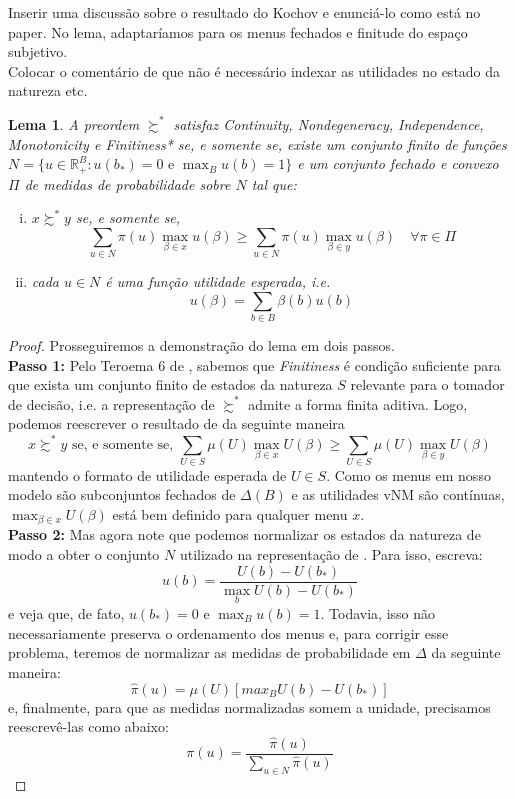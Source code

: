 \documentclass[11pt, a4paper]{article}
\theoremstyle{nonumberplain}
\newtheorem{proof}{Dem.}
\theoremstyle{plain}
\theoremstyle{plain}
\newtheorem{lemma}{Lema}
\begin{document}
{\color{cadmiumgreen}Inserir uma discussão sobre o resultado do Kochov e enunciá-lo como está no paper. No lema, adaptaríamos para os menus fechados e finitude do espaço subjetivo.\\
Colocar o comentário de que não é necessário indexar as utilidades no estado da natureza etc.}


\begin{lemma} A preordem $\succsim^*$ satisfaz \emph{Continuity}, \emph{Nondegeneracy}, \emph{Independence}, \emph{Monotonicity} e \emph{Finitiness*} se, e somente se, existe um conjunto finito de funções $N=\{u \in \mathbb{R}^B_+:u(b_*)=0\text { e }\max_{B}u(b)=1\}$ e um conjunto fechado e convexo $\Pi$ de medidas de probabilidade sobre $N$ tal que:
\begin{enumerate}[(i)]
\item $x\succsim^* y$ se, e somente se, $$ \sum_{u\in N} \pi(u)\max_{\beta\in x}u(\beta) \geq \sum_{u\in N} \pi(u)\max_{\beta\in y}u(\beta)\quad \forall\pi\in\Pi$$  
\item cada $u \in N$ é uma função utilidade esperada, i.e. $$u(\beta)=\sum_{b\in B} \beta(b)u(b)$$ 
\end{enumerate}     
\end{lemma}
\begin{proof}
Prosseguiremos a demonstração do lema em dois passos.\\
\textbf{Passo 1:} Pelo Teroema 6 de \cite{Dekel2009}, sabemos que \emph{Finitiness} é condição suficiente para que exista um conjunto finito de estados da natureza $S$ relevante para o tomador de decisão, i.e. a representação de $\succsim^*$ admite a forma finita aditiva. Logo, podemos reescrever o resultado de \cite{Kochov2007} da seguinte maneira $$x\succsim^* y \text{ se, e somente se, } \sum_{U\in S} \mu(U)\max_{\beta\in x}U(\beta) \geq \sum_{U\in S} \mu(U)\max_{\beta\in y}U(\beta)$$ 
mantendo o formato de utilidade esperada de $U\in S$. Como os menus em nosso modelo são subconjuntos fechados de $\Delta(B)$ e as utilidades vNM são contínuas, $\max_{\beta\in x}U(\beta)$ está bem definido para qualquer menu $x$.\\
\textbf{Passo 2:} Mas agora note que podemos normalizar os estados da natureza de modo a obter o conjunto $N$ utilizado na representação de \cite{Epstein2007}. Para isso, escreva:
$$u(b)=\frac{U(b)-U(b_*)}{\max_b U(b)-U(b_*)}$$  
e veja que, de fato, $u(b_*)=0$ e $\max_{B} u(b)=1$. Todavia, isso não necessariamente preserva o ordenamento dos menus e, para corrigir esse problema, teremos de normalizar as medidas de probabilidade em $\Delta$ da seguinte maneira:
$$ \hat{\pi}(u)=\mu(U)\left[max_B U(b)-U(b_*)\right]$$ e, finalmente, para que as medidas normalizadas somem a unidade, precisamos reescrevê-las como abaixo:  $$\pi(u)=\frac{\hat{\pi}(u)}{\sum_{u\in N}\hat{\pi}(u)}$$ 
\end{proof}
\end{document}

